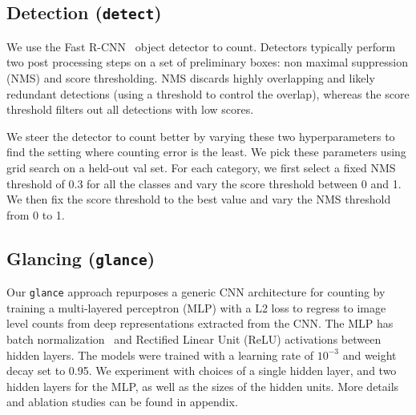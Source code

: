 \documentclass[10pt,twocolumn,letterpaper]{article}
\newcommand{\detect}{\texttt{detect}\xspace}
\newcommand{\glance}{\texttt{glance}\xspace}
\begin{document}
\subsection{Detection (\detect{})}\label{app:frcn} We use the Fast R-CNN~\cite{Girshick2015FastR-CNN} object detector to count. Detectors typically perform two post processing steps on a set of preliminary boxes: non maximal suppression (NMS) and score thresholding. NMS discards highly overlapping and likely redundant detections (using a threshold to control the overlap), whereas the score threshold filters out all detections with low scores. 


We steer the detector to count better by varying these two hyperparameters to find the setting where counting error is the least. We pick these parameters using grid search on a held-out val set. For each category, we first select a fixed NMS threshold of 0.3
for all the classes and vary the score threshold between 0 and 1. We then fix the score threshold to the best value and vary the NMS threshold from 0 to 1. 

\subsection{Glancing (\glance{})}\label{app:glance}
Our \glance approach repurposes a generic CNN architecture for counting by training a multi-layered perceptron (MLP) with a L2 loss to regress to image level counts from deep representations extracted from the CNN. The MLP has batch normalization~\cite{Ioffe2015} and Rectified Linear Unit (ReLU) activations between hidden layers. The models were trained with a learning rate of $10^{-3}$ and weight decay set to 0.95. We experiment with choices of a single hidden layer, and two hidden layers for the MLP, as well as the sizes of the hidden units. More details and ablation studies can be found in appendix.


\vspace{-8pt}
\end{document}
